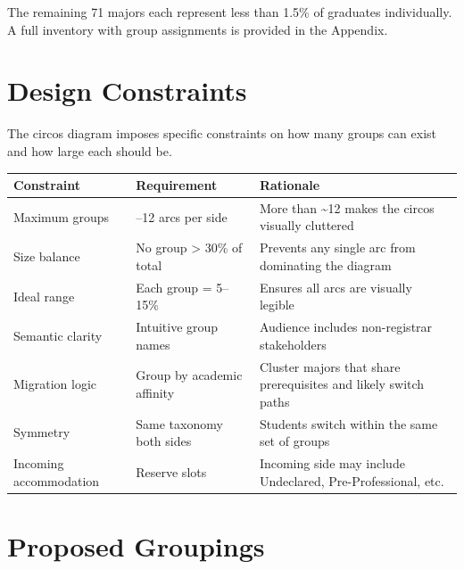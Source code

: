 \documentclass[
  11pt,
  letterpaper,
]{report}
\begin{document}
The remaining 71 majors each represent less than 1.5\% of graduates
individually. A full inventory with group assignments is provided in the
Appendix.

\chapter{Design Constraints}\label{design-constraints}

The circos diagram imposes specific constraints on how many groups can
exist and how large each should be.

\begin{longtable}[]{@{}
  >{\raggedright\arraybackslash}p{}
  >{\raggedright\arraybackslash}p{}
  >{\raggedright\arraybackslash}p{}@{}}
\toprule\noalign{}
\begin{minipage}[b]{\linewidth}\raggedright
Constraint
\end{minipage} & \begin{minipage}[b]{\linewidth}\raggedright
Requirement
\end{minipage} & \begin{minipage}[b]{\linewidth}\raggedright
Rationale
\end{minipage} \\
\midrule\noalign{}
\endhead
\bottomrule\noalign{}
\endlastfoot
Maximum groups & 8--12 arcs per side & More than \textasciitilde12 makes
the circos visually cluttered \\
Size balance & No group \textgreater{} 30\% of total & Prevents any
single arc from dominating the diagram \\
Ideal range & Each group = 5--15\% & Ensures all arcs are visually
legible \\
Semantic clarity & Intuitive group names & Audience includes
non-registrar stakeholders \\
Migration logic & Group by academic affinity & Cluster majors that share
prerequisites and likely switch paths \\
Symmetry & Same taxonomy both sides & Students switch within the same
set of groups \\
Incoming accommodation & Reserve slots & Incoming side may include
Undeclared, Pre-Professional, etc. \\
\end{longtable}

\chapter{Proposed Groupings}\label{proposed-groupings}
\end{document}
